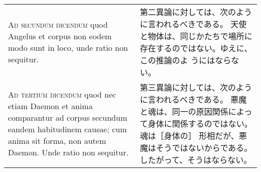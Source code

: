 \documentclass[10pt]{jsarticle} %
\begin{document}
\begin{longtable}{p{21em}p{21em}}
\\



{\scshape Ad secundum dicendum} quod Angelus et corpus
 non eodem modo sunt in loco, unde ratio non sequitur.

&

第二異論に対しては、次のように言われるべきである。
天使と物体は、同じかたちで場所に存在するのではない。ゆえに、この推論のよ
 うにはならない。

\\



{\scshape Ad tertium dicendum} quod nec etiam Daemon et
anima comparantur ad corpus secundum eandem habitudinem causae; cum
anima sit forma, non autem Daemon. Unde ratio non sequitur.


&

第三異論に対しては、次のように言われるべきである。
悪魔と魂は、同一の原因関係によって身体に関係するのではない。魂は［身体の］
 形相だが、悪魔はそうではないからである。したがって、そうはならない。


\end{longtable}
\newpage
\end{document}
